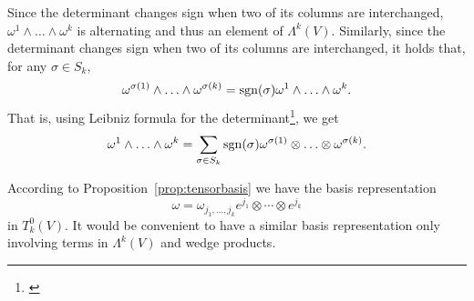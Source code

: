 Since the determinant changes sign when two of its columns are interchanged, $\omega^1\wedge\ldots\wedge\omega^k$ is alternating and thus an element of $\Lambda^k(V)$.
Similarly, since the determinant changes sign when two of its columns are interchanged, it holds that, for any $\sigma\in S_k$,
\begin{equation}\label{equiv:permut}
  \omega^{\sigma(1)}\wedge\ldots\wedge\omega^{\sigma(k)} = \operatorname{sgn}(\sigma) \omega^1\wedge\ldots\wedge\omega^k.
\end{equation}
That is, using Leibniz formula for the determinant\footnote{\cite[Equation (B.3)]{book:lee}}, we get
\begin{equation}\label{eq:detLeibniz}
  \omega^1\wedge\ldots\wedge\omega^k = \sum_{\sigma\in S_k}\operatorname{sgn}(\sigma) \omega^{\sigma(1)}\otimes\ldots\otimes\omega^{\sigma(k)}.
\end{equation}

According to Proposition~\ref{prop:tensorbasis} we have the basis representation
\begin{equation}
  \omega = \omega_{j_1, \ldots, j_k} e^{j_1}\otimes \cdots \otimes e^{j_k}
\end{equation}
in $T_k^0(V)$.
It would be convenient to have a similar basis representation only involving terms in $\Lambda^k(V)$ and wedge products.

